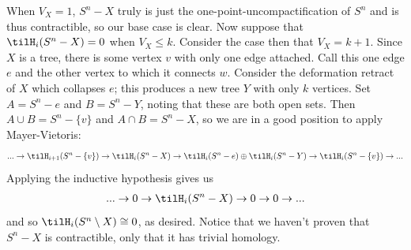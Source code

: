 \begin{homework}[e]
\begin{prf}
    When $V_X = 1$, $S^n - X$ truly is just the one-point-uncompactification of $S^n$ and is thus contractible, so our base case is clear. Now suppose that $\tilH_i(S^n - X) = 0$ when $V_X \leq k$. Consider the case then that $V_X = k+1$. Since $X$ is a tree, there is some vertex $v$ with only one edge attached. Call this one edge $e$ and the other vertex to which it connects $w$. Consider the deformation retract of $X$ which collapses $e$; this produces a new tree $Y$ with only $k$ vertices. Set $A = S^n - e$ and $B = S^n - Y$, noting that these are both open sets. Then $A \cup B = S^n - \{v\}$ and $A\cap B = S^n - X$, so we are in a good position to apply Mayer-Vietoris:
    \begin{align*}
      ... \to \tilH_{i+1}(S^n - \{v\}) \to \tilH_i(S^n - X) \to \tilH_i(S^n - e) \oplus \tilH_i(S^n - Y) \to \tilH_i(S^n - \{v\}) \to ...
    \end{align*}
    Applying the inductive hypothesis gives us
    \begin{align*}
      ... \to 0 \to \tilH_i(S^n - X) \to 0 \to 0 \to ...
    \end{align*}
    and so $\tilH_i(S^n\setminus X)\cong 0$, as desired. Notice that we haven't proven that $S^n - X$ is contractible, only that it has trivial homology.

    \bigskip


\end{prf}
\end{homework}
